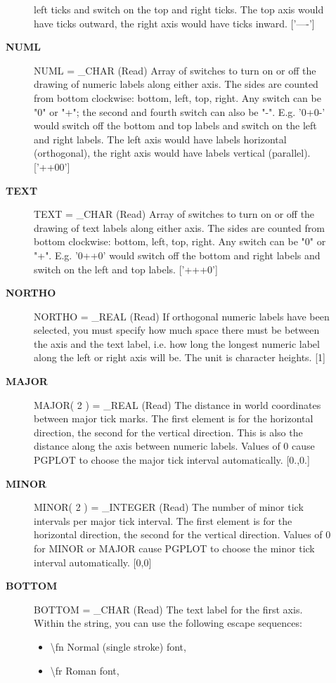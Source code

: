 \begin{description}
\begin{description}
   left ticks and switch on the top and right ticks. The top axis
   would have ticks outward, the right axis would have ticks
   inward. ['----']
\item [\textbf{NUML}]
NUML = \_CHAR (Read)
   Array of switches to turn on or off the drawing of numeric
   labels along either axis. The sides are counted from bottom
   clockwise: bottom, left, top, right. Any switch can be
   "0" or "+"; the second and fourth switch can also be "-". E.g.
   '0+0-' would switch off the bottom and top labels and switch
   on the left and right labels. The left axis would have labels
   horizontal (orthogonal), the right axis would have labels
   vertical (parallel). ['++00']
\item [\textbf{TEXT}]
TEXT = \_CHAR (Read)
   Array of switches to turn on or off the drawing of text labels
   along either axis. The sides are counted from bottom
   clockwise: bottom, left, top, right. Any switch can be
   "0" or "+". E.g. '0++0' would switch off the bottom and right
   labels and switch on the left and top labels. ['+++0']
\item [\textbf{NORTHO}]
NORTHO = \_REAL (Read)
   If orthogonal numeric labels have been selected, you must
   specify how much space there must be between the
   axis and the text label, i.e. how long the longest numeric
   label along the left or right axis will be. The unit is character
   heights. [1]
\item [\textbf{MAJOR}]
MAJOR( 2 ) = \_REAL (Read)
   The distance in world coordinates between major tick marks. The
   first element is for the horizontal direction, the second for
   the vertical direction. This is also the distance along the
   axis between numeric labels. Values of 0 cause PGPLOT to choose
   the major tick interval automatically. [0.,0.]
\item [\textbf{MINOR}]
MINOR( 2 ) = \_INTEGER (Read)
   The number of minor tick intervals per major tick interval. The
   first element is for the horizontal direction, the second for
   the vertical direction. Values of 0 for MINOR or MAJOR cause
   PGPLOT to choose the minor tick interval automatically. [0,0]
\item [\textbf{BOTTOM}]
BOTTOM = \_CHAR (Read)
   The text label for the first axis. Within the string, you can
   use the following escape sequences:
   \begin{itemize}
   \item \textbackslash fn Normal (single stroke) font,
   \item \textbackslash fr Roman font,

\end{itemize}
\end{description}
\end{description}
